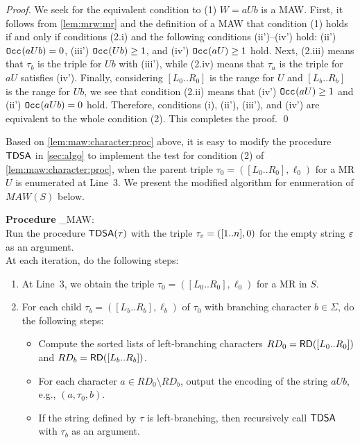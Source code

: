 \begin{proof}
  We seek for the equivalent condition to (1) $W = aUb$ is a MAW.
  First, it follows from \cref{lem:mrw:mr} and the definition of a MAW that condition (1) holds if and only if conditions (2.i) and the following conditions (ii')--(iv') hold: 
  (ii') $\mathtt{Occ}_{}(aUb) = 0$, 
  (iii') $\mathtt{Occ}_{}(Ub) \ge 1$,  and
  (iv') $\mathtt{Occ}_{}(aU) \ge 1$ hold. 
  Next, (2.iii) means that $\tau_b$ is the triple for $Ub$ with (iii'), while 
  (2.iv) means that $\tau_a$ is the triple for $aU$ satisfies (iv').
  Finally, considering 
  $[L_0..R_0]$ is the range for $U$ and
  $[L_b..R_b]$ is the range for $Ub$, 
  we see that condition (2.ii) means that (iv') $\mathtt{Occ}_{}(aU) \ge 1$ and (ii') $\mathtt{Occ}_{}(aUb) = 0$ hold.
  Therefore, conditions (i), (ii'), (iii'), and (iv') are equivalent to the whole condition (2). This completes the proof.
  \qed
\end{proof}

Based on \cref{lem:maw:character:proc} above, it is easy to modify the procedure $\textsf{TDSA}$ in \cref{sec:algo} to implement the test for condition (2) of \cref{lem:maw:character:proc}, when the parent triple $\tau_0 = ([L_0..R_0], \ell_0)$ for a MR $U$ is enumerated at Line~3.
We present the modified algorithm for enumeration of $MAW(S)$ below. 

{
  \setlength{\interspacetitleruled}{0pt}%
  \setlength{\algotitleheightrule}{0pt}%
  \begin{algorithm}[h]
\textbf{Procedure} \TDSA\_MAW:\\
Run the procedure $\textsf{TDSA}(\tau)$ with the triple $\tau_\varepsilon = ([1..n], 0)$ for the empty string $\varepsilon$ as an argument.\\ 
At each iteration, do the following steps:\\ 
\begin{enumerate}[(1)]
\item At Line~3, we obtain the triple $\tau_0 = ([L_0..R_0], \ell_0)$ for a MR in $S$. 

\item For each child $\tau_b = ([L_b..R_b], \ell_b)$ of $\tau_0$ with branching character $b \in \Sigma$, do the following steps: 
\begin{itemize}

\item Compute the sorted lists of left-branching characters $RD_0 = \mbox{\textsf{RD}}([L_0..R_0])$ and $RD_b = \mbox{\textsf{RD}}([L_b..R_b])$. 

\item For each character $a \in RD_0\setminus RD_b$, output the encoding of the string $a U b$, e.g., $(a, \tau_0, b)$. 

\item If the string defined by $\tau$ is left-branching, then recursively call $\textsf{TDSA}$ with $\tau_b$ as an argument. 
\end{itemize}
\end{enumerate}
  \end{algorithm}
}  


